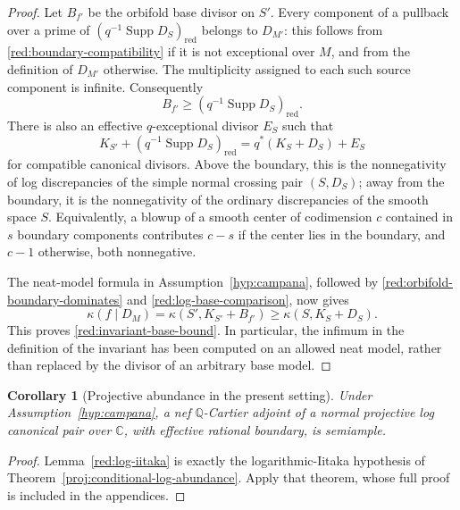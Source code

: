 \documentclass[11pt,letterpaper]{article}
\newcommand{\Q}{\mathbb{Q}}
\newcommand{\C}{\mathbb{C}}
\DeclareMathOperator{\Supp}{Supp}
\newtheorem{corollary}[theorem]{Corollary}
\theoremstyle{definition}
\theoremstyle{remark}
\begin{document}
\begin{proof}
Let \(B_{f'}\) be the orbifold base divisor on \(S'\). Every component
of a pullback over a prime of
\((q^{-1}\Supp D_S)_{\mathrm{red}}\) belongs to \(D_{M'}\): this follows
from \eqref{red:boundary-compatibility} if it is not exceptional over
\(M\), and from the definition of \(D_{M'}\) otherwise. The multiplicity
assigned to each such source component is infinite. Consequently
\begin{equation}\label{red:orbifold-boundary-dominates}
 B_{f'}\geq(q^{-1}\Supp D_S)_{\mathrm{red}}.
\end{equation}
There is also an effective \(q\)-exceptional divisor \(E_S\) such that
\begin{equation}\label{red:log-base-comparison}
 K_{S'}+(q^{-1}\Supp D_S)_{\mathrm{red}}
   =q^*(K_S+D_S)+E_S
\end{equation}
for compatible canonical divisors. Above the boundary, this is the
nonnegativity of log discrepancies of the simple normal crossing pair
\((S,D_S)\); away from the boundary, it is the nonnegativity of the
ordinary discrepancies of the smooth space \(S\). Equivalently, a
blowup of a smooth center of codimension \(c\) contained in \(s\) boundary
components contributes \(c-s\) if the center lies in the boundary, and
\(c-1\) otherwise, both nonnegative.

The neat-model formula in Assumption~\ref{hyp:campana}, followed by
\eqref{red:orbifold-boundary-dominates} and
\eqref{red:log-base-comparison}, now gives
\[
 \kappa(f\mid D_M)
 =\kappa(S',K_{S'}+B_{f'})
 \geq\kappa(S,K_S+D_S).
\]
This proves \eqref{red:invariant-base-bound}. In particular, the infimum
in the definition of the invariant has been computed on an allowed neat
model, rather than replaced by the divisor of an arbitrary base model.
\end{proof}

\begin{corollary}[Projective abundance in the present setting]
\label{red:projective}
Under Assumption~\ref{hyp:campana}, a nef \(\Q\)-Cartier adjoint of a
normal projective log canonical pair over \(\C\), with effective rational
boundary, is semiample.
\end{corollary}

\begin{proof}
Lemma~\ref{red:log-iitaka} is exactly the logarithmic-Iitaka hypothesis
of Theorem~\ref{proj:conditional-log-abundance}. Apply that theorem,
whose full proof is included in the appendices.
\end{proof}
\end{document}
